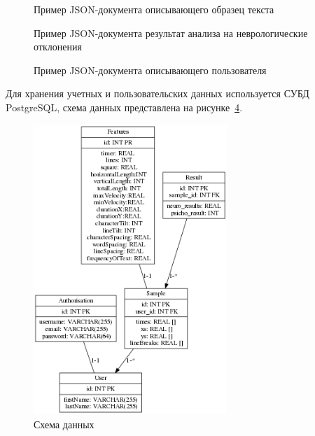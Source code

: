 \begin{figure}[ht]
    \centering
    
    \caption{Пример JSON-документа описывающего образец текста}
    \label{listing:development:json:sample}
\end{figure}   
\begin{figure}[ht]
    \centering
    
    \caption{Пример JSON-документа результат анализа на неврологические отклонения}
    \label{listing:development:json:result}
\end{figure}
\begin{figure}[ht]
    \centering
    
    \caption{Пример JSON-документа описывающего пользователя}
    \label{listing:development:json:user}
\end{figure} 

Для хранения учетных и пользовательских данных используется СУБД PostgreSQL, схема данных представлена на рисунке~\ref{fig:develoipment:data_base}.

\begin{figure}[ht]
    \centering
    \includegraphics[width=0.65\textwidth]{figures/dataDiagram.png}
    \caption{Схема данных}
    \label{fig:develoipment:data_base}
\end{figure}    

